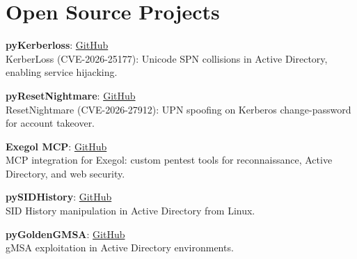 \documentclass[9pt,a4paper]{extarticle}
\begin{document}
\begin{minipage}[t]{0.48\textwidth}
\section{Open Source Projects}

\textbf{pyKerberloss}: \href{https://github.com/felixbillieres/pyKerberloss}{GitHub} \\
KerberLoss (CVE-2026-25177): Unicode SPN collisions in Active Directory, enabling service hijacking.

\textbf{pyResetNightmare}: \href{https://github.com/felixbillieres/pyResetNightmare}{GitHub} \\
ResetNightmare (CVE-2026-27912): UPN spoofing on Kerberos change-password for account takeover.

\textbf{Exegol MCP}: \href{https://github.com/ThePorgs/Exegol-MCP}{GitHub} \\
MCP integration for Exegol: custom pentest tools for reconnaissance, Active Directory, and web security.

\textbf{pySIDHistory}: \href{https://github.com/felixbillieres/pySIDHistory}{GitHub} \\
SID History manipulation in Active Directory from Linux.

\textbf{pyGoldenGMSA}: \href{https://github.com/felixbillieres/pyGoldenGMSA}{GitHub} \\
gMSA exploitation in Active Directory environments.

\end{minipage}
\hfill
\end{document}
